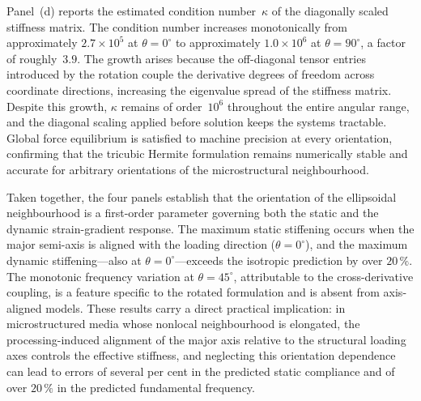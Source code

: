 \documentclass[final,3p,times,fleqn]{elsarticle}
\begin{document}
Panel~(d) reports the estimated condition number~$\kappa$ of the
diagonally scaled stiffness matrix.
The condition number increases monotonically from approximately
$2.7\times10^{5}$ at $\theta = 0^{\circ}$ to approximately
$1.0\times10^{6}$ at $\theta = 90^{\circ}$, a factor of roughly~$3.9$.
The growth arises because the off-diagonal tensor entries introduced by
the rotation couple the derivative degrees of freedom across coordinate
directions, increasing the eigenvalue spread of the stiffness matrix.
Despite this growth, $\kappa$ remains of order~$10^{6}$ throughout the
entire angular range, and the diagonal scaling applied before solution
keeps the systems tractable.
Global force equilibrium is satisfied to machine precision at every
orientation, confirming that the tricubic Hermite formulation remains
numerically stable and accurate for arbitrary orientations of the
microstructural neighbourhood.

Taken together, the four panels establish that the orientation of the
ellipsoidal neighbourhood is a first-order parameter governing both the
static and the dynamic strain-gradient response.
The maximum static stiffening occurs when the major semi-axis is aligned
with the loading direction ($\theta = 0^{\circ}$), and the maximum
dynamic stiffening---also at $\theta = 0^{\circ}$---exceeds the
isotropic prediction by over $20\,\%$.
The monotonic frequency variation at $\theta = 45^{\circ}$,
attributable to the cross-derivative coupling, is a feature specific to
the rotated formulation and is absent from axis-aligned models.
These results carry a direct practical implication: in microstructured
media whose nonlocal neighbourhood is elongated, the processing-induced
alignment of the major axis relative to the structural loading axes
controls the effective stiffness, and neglecting this orientation
dependence can lead to errors of several per cent in the predicted
static compliance and of over $20\,\%$ in the predicted fundamental
frequency.

%
%
\end{document}
